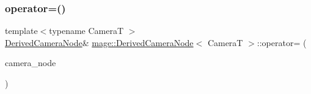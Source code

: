 \hypertarget{classmage_1_1_derived_camera_node_a5faeff6f71a85b46d18f5b55e8dcf756}{}\label{classmage_1_1_derived_camera_node_a5faeff6f71a85b46d18f5b55e8dcf756} 
\subsubsection{\texorpdfstring{operator=()}{operator=()}\hspace{0.1cm}{\footnotesize\ttfamily [2/2]}}
{\footnotesize\ttfamily template$<$typename CameraT $>$ \\
\hyperlink{classmage_1_1_derived_camera_node}{Derived\+Camera\+Node}\& \hyperlink{classmage_1_1_derived_camera_node}{mage\+::\+Derived\+Camera\+Node}$<$ CameraT $>$\+::operator= (\begin{DoxyParamCaption}\item[{\hyperlink{classmage_1_1_derived_camera_node}{Derived\+Camera\+Node}$<$ CameraT $>$ \&\&}]{camera\+\_\+node }\end{DoxyParamCaption})\hspace{0.3cm}{\ttfamily [delete]}}

